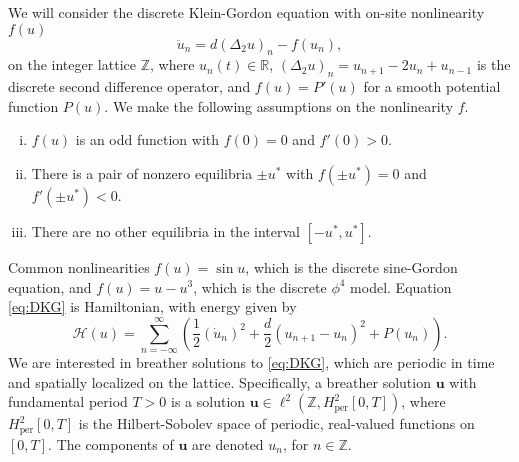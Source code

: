 \documentclass[12pt,reqno]{amsart}
\def\R{{\mathbb R}}
\def\Z{{\mathbb Z}}
\def\per{\textrm{per}}
\newcommand{\uvec}{\mathbf{u}}
\begin{document}
We will consider the discrete Klein-Gordon equation with on-site nonlinearity $f(u)$
\begin{equation}\label{eq:DKG}
\ddot{u}_n = d (\Delta_2 u)_n - f(u_n),
\end{equation}
on the integer lattice $\Z$, where $u_n(t) \in \R$, $(\Delta_2 u)_n = u_{n+1} - 2 u_n + u_{n-1}$ is the discrete second difference operator, and $f(u) = P'(u)$ for a smooth potential function $P(u)$. We make the following assumptions on the nonlinearity $f$. 
\begin{enumerate}[(i)]
	\item $f(u)$ is an odd function with $f(0) = 0$ and $f'(0) > 0$.
	\item There is a pair of nonzero equilibria $\pm u^*$ with $f(\pm u^*) = 0$ and $f'(\pm u^*) < 0$.
	\item There are no other equilibria in the interval $[-u^*, u^*]$.
\end{enumerate}
Common nonlinearities $f(u) = \sin u$, which is the discrete sine-Gordon equation, and $f(u) = u - u^3$, which is the discrete $\phi^4$ model. Equation \cref{eq:DKG} is Hamiltonian, with energy given by \cite{KevrekidisWeinstein2000}
\begin{equation}\label{eq:H}
	\mathcal{H}(u) = \sum_{n=-\infty}^\infty 
	\left( \frac{1}{2} (\dot{u}_n)^2 + \frac{d}{2} (u_{n+1} - u_n)^2 + P(u_n) \right).
\end{equation}
We are interested in breather solutions to \cref{eq:DKG}, which are periodic in time and spatially localized on the lattice. Specifically, a breather solution $\uvec$ with fundamental period $T>0$ is a solution $\uvec \in \ell^2(\Z, H^2_\per[0,T])$, where $H^2_\per[0,T]$ is the Hilbert-Sobolev space of periodic, real-valued functions on $[0,T]$. The components of $\uvec$ are denoted $u_n$, for $n \in \Z$.
\end{document}
